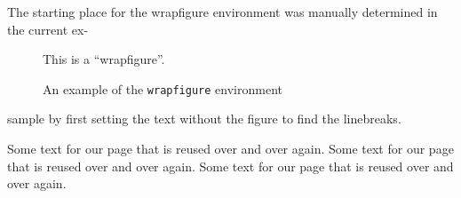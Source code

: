 \documentclass{tlc2/ttctexa}
\newcommand\sample{Some text for our page
 that is reused over and over again. }
\begin{document}
The starting place for the wrapfigure
environment was manually determined in
the current ex-
\begin{figure}
  \centering
  This is a ``wrapfigure''.
  \caption{An example of the
    \texttt{wrapfigure} environment}
\end{figure}
sample by first setting the text without
the figure to find the linebreaks.

\sample \sample \sample
\end{document}
